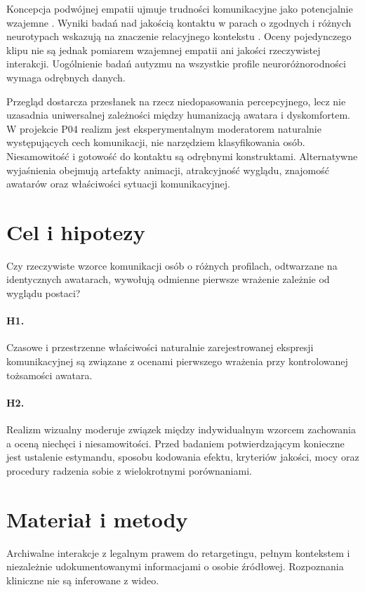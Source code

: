 \documentclass[11pt,a4paper]{article}
\begin{document}
Koncepcja podwójnej empatii ujmuje trudności komunikacyjne jako potencjalnie wzajemne \parencite{milton2012}. Wyniki badań nad jakością kontaktu w parach o zgodnych i różnych neurotypach wskazują na znaczenie relacyjnego kontekstu \parencite{crompton2020}. Oceny pojedynczego klipu nie są jednak pomiarem wzajemnej empatii ani jakości rzeczywistej interakcji. Uogólnienie badań autyzmu na wszystkie profile neuroróżnorodności wymaga odrębnych danych.

Przegląd \textcite{katsyri2015} dostarcza przesłanek na rzecz niedopasowania percepcyjnego, lecz nie uzasadnia uniwersalnej zależności między humanizacją awatara i dyskomfortem. W projekcie P04 realizm jest eksperymentalnym moderatorem naturalnie występujących cech komunikacji, nie narzędziem klasyfikowania osób. Niesamowitość i gotowość do kontaktu są odrębnymi konstruktami. Alternatywne wyjaśnienia obejmują artefakty animacji, atrakcyjność wyglądu, znajomość awatarów oraz właściwości sytuacji komunikacyjnej.

\section{Cel i hipotezy}
Czy rzeczywiste wzorce komunikacji osób o różnych profilach, odtwarzane na identycznych awatarach, wywołują odmienne pierwsze wrażenie zależnie od wyglądu postaci?
\paragraph{H1.} Czasowe i przestrzenne właściwości naturalnie zarejestrowanej ekspresji komunikacyjnej są związane z ocenami pierwszego wrażenia przy kontrolowanej tożsamości awatara.
\paragraph{H2.} Realizm wizualny moderuje związek między indywidualnym wzorcem zachowania a oceną niechęci i niesamowitości.
Przed badaniem potwierdzającym konieczne jest ustalenie estymandu, sposobu kodowania efektu, kryteriów jakości, mocy oraz procedury radzenia sobie z wielokrotnymi porównaniami.
\section{Materiał i metody}
Archiwalne interakcje z legalnym prawem do retargetingu, pełnym kontekstem i niezależnie udokumentowanymi informacjami o osobie źródłowej. Rozpoznania kliniczne nie są inferowane z wideo.
\end{document}
